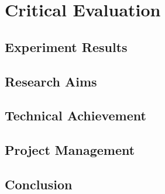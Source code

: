 \chapter{Critical Evaluation}
%
%
%
%
%

\section{Experiment Results}

\section{Research Aims}

\section{Technical Achievement}

\section{Project Management}

\section{Conclusion}